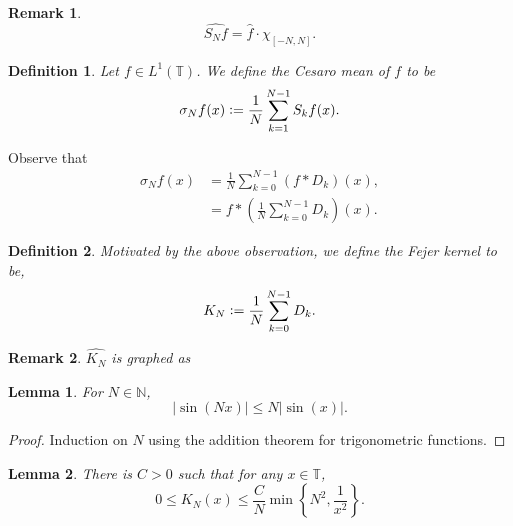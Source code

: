 \documentclass[8pt]{article}
\newtheorem{definition}{Definition}[section]
\newtheorem{lemma}{Lemma}[section]
\newtheorem{remark}{Remark}[section]
\newcommand{\ab}[1]{\vert #1 \vert}
\newcommand{\defeq}{\vcentcolon=}
\newcommand{\bN}[0]{\mathbb{N}}
\newcommand{\bT}[0]{\mathbb{T}}
\begin{document}
\begin{remark}
  \begin{equation*}
    \widehat{S_Nf} = \hat{f}\cdot\chi_{[-N,N]}.
  \end{equation*}
\end{remark}
\begin{definition}
  Let $f\in L^1(\bT)$. We define the Cesaro mean of $f$ to be
  \begin{equation*}
    \sigma_Nf(x) \defeq {\frac 1 N}\sum_{k=1}^{N-1}S_kf(x).
  \end{equation*} 
\end{definition}
Observe that 
\begin{align*}
  \sigma_Nf(x) & = {\frac 1 N}\sum_{k=0}^{N-1}(f\ast D_k)(x),\\
  & = f\ast\left({\frac 1 N}\sum_{k=0}^{N-1}D_k\right)(x).
\end{align*}
\begin{definition}
  Motivated by the above observation, we define the Fejer kernel to be,
  \begin{equation*}
    K_N\defeq {\frac 1 N}\sum_{k=0}^{N-1}D_k.
  \end{equation*}
\end{definition}
\begin{remark}
  $\widehat{K_N}$ is graphed as
  \begin{center}
  \end{center}
\end{remark}
\begin{lemma}
  For $N\in\bN$, 
  \begin{equation*}
  \vert\sin(Nx)\vert\leq N\ab{\sin(x)}.
  \end{equation*}
  \label{lemma_2_6}
\end{lemma}
\begin{proof}
  Induction on $N$ using the addition theorem for trigonometric functions.
\end{proof}
\begin{lemma}
  \label{lemma_2_7}
  There is $C>0$ such that for any $x\in \bT$,
  \begin{equation*}
    0\leq K_N(x)\leq {\frac C N}\min\left\{N^2,{\frac 1 {x^2}}\right\}.
  \end{equation*}
\end{lemma}
\end{document}
